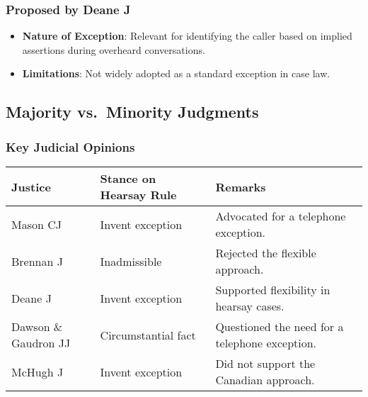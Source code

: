\subsubsection{Proposed by Deane J}\label{proposed-by-deane-j}

\begin{itemize}
\tightlist
\item
  \textbf{Nature of Exception}: Relevant for identifying the caller
  based on implied assertions during overheard conversations.
\item
  \textbf{Limitations}: Not widely adopted as a standard exception in
  case law.
\end{itemize}

\subsection{  Majority vs.~Minority
Judgments}\label{majority-vs.-minority-judgments}

\subsubsection{Key Judicial Opinions}\label{key-judicial-opinions}

\begin{longtable}[]{@{}
  >{\raggedright\arraybackslash}p{}
  >{\raggedright\arraybackslash}p{}
  >{\raggedright\arraybackslash}p{}@{}}
\toprule\noalign{}
\begin{minipage}[b]{\linewidth}\raggedright
Justice
\end{minipage} & \begin{minipage}[b]{\linewidth}\raggedright
Stance on Hearsay Rule
\end{minipage} & \begin{minipage}[b]{\linewidth}\raggedright
Remarks
\end{minipage} \\
\midrule\noalign{}
\endhead
\bottomrule\noalign{}
\endlastfoot
Mason CJ & Invent exception & Advocated for a telephone exception. \\
Brennan J & Inadmissible & Rejected the flexible approach. \\
Deane J & Invent exception & Supported flexibility in hearsay cases. \\
Dawson \& Gaudron JJ & Circumstantial fact & Questioned the need for a
telephone exception. \\
McHugh J & Invent exception & Did not support the Canadian approach. \\
\end{longtable}

